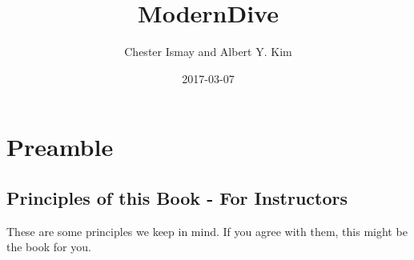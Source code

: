 \documentclass[]{tufte-book}
\title{ModernDive}
\author{Chester Ismay and Albert Y. Kim}
\date{2017-03-07}
\begin{document}
\let\allcaps=\relax
\maketitle



{
\setcounter{tocdepth}{1}
\tableofcontents
}

\chapter{Preamble}\label{preamble}

\section{Principles of this Book - For
Instructors}\label{principles-of-this-book---for-instructors}

These are some principles we keep in mind. If you agree with them, this
might be the book for you.
\end{document}
